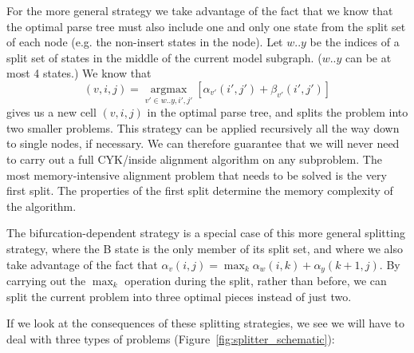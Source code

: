 \documentclass[11pt]{article}
\def\argmax{\mathop{\mathrm{argmax}}\limits}
\begin{document}
For the more general strategy we take advantage of the fact that we
know that the optimal parse tree must also include one and only one
state from the split set of each node (e.g. the non-insert states in
the node). Let $w..y$ be the indices of a split set of states in the
middle of the current model subgraph. ($w..y$ can be at most 4
states.)  We know that
\[
(v,i,j) = \argmax_{v' \in w..y,i',j'} \left[ \alpha_{v'}(i',j') +
\beta_{v'}(i',j') \right]
\]
gives us a new cell $(v,i,j)$ in the optimal parse tree, and splits
the problem into two smaller problems. This strategy can be applied
recursively all the way down to single nodes, if necessary. We can
therefore guarantee that we will never need to carry out a full
CYK/inside alignment algorithm on any subproblem. The most
memory-intensive alignment problem that needs to be solved is the very
first split.  The properties of the first split determine the memory
complexity of the algorithm.

The bifurcation-dependent strategy is a special case of this more
general splitting strategy, where the B state is the only member of
its split set, and where we also take advantage of the fact that
$\alpha_v(i,j) = \max_k \alpha_w(i,k) + \alpha_y(k+1,j)$. By carrying
out the $\max_k$ operation during the split, rather than before, we
can split the current problem into three optimal pieces instead of
just two.

If we look at the consequences of these splitting strategies, we see
we will have to deal with three types of problems
(Figure~\ref{fig:splitter_schematic}):
\end{document}
